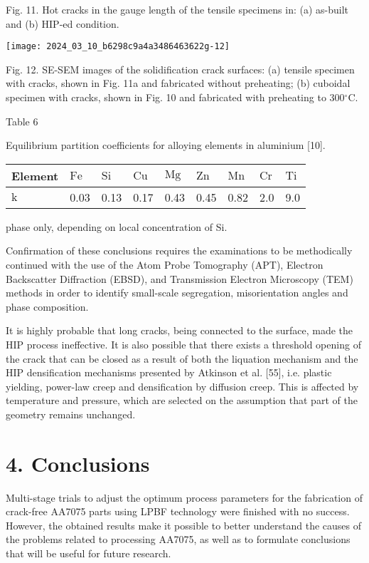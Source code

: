 \documentclass[10pt]{article}
\begin{document}
Fig. 11. Hot cracks in the gauge length of the tensile specimens in: (a) as-built and (b) HIP-ed condition.

\begin{center}
\texttt{[image: 2024\_03\_10\_b6298c9a4a3486463622g-12]}
\end{center}

Fig. 12. SE-SEM images of the solidification crack surfaces: (a) tensile specimen with cracks, shown in Fig. 11a and fabricated without preheating; (b) cuboidal specimen with cracks, shown in Fig. 10 and fabricated with preheating to $300{ }^{\circ} \mathrm{C}$.

Table 6

Equilibrium partition coefficients for alloying elements in aluminium [10].

\begin{center}
\begin{tabular}{lllllllll}
\hline
Element & $\mathrm{Fe}$ & $\mathrm{Si}$ & $\mathrm{Cu}$ & $\mathrm{Mg}$ & $\mathrm{Zn}$ & $\mathrm{Mn}$ & $\mathrm{Cr}$ & $\mathrm{Ti}$ \\
\hline
$\mathrm{k}$ & 0.03 & 0.13 & 0.17 & 0.43 & 0.45 & 0.82 & 2.0 & 9.0 \\
\hline
\end{tabular}
\end{center}

phase only, depending on local concentration of Si.

Confirmation of these conclusions requires the examinations to be methodically continued with the use of the Atom Probe Tomography (APT), Electron Backscatter Diffraction (EBSD), and Transmission Electron Microscopy (TEM) methods in order to identify small-scale segregation, misorientation angles and phase composition.

It is highly probable that long cracks, being connected to the surface, made the HIP process ineffective. It is also possible that there exists a threshold opening of the crack that can be closed as a result of both the liquation mechanism and the HIP densification mechanisms presented by Atkinson et al. [55], i.e. plastic yielding, power-law creep and densification by diffusion creep. This is affected by temperature and pressure, which are selected on the assumption that part of the geometry remains unchanged.

\section*{4. Conclusions}
Multi-stage trials to adjust the optimum process parameters for the fabrication of crack-free AA7075 parts using LPBF technology were finished with no success. However, the obtained results make it possible to better understand the causes of the problems related to processing AA7075, as well as to formulate conclusions that will be useful for future research.
\end{document}
